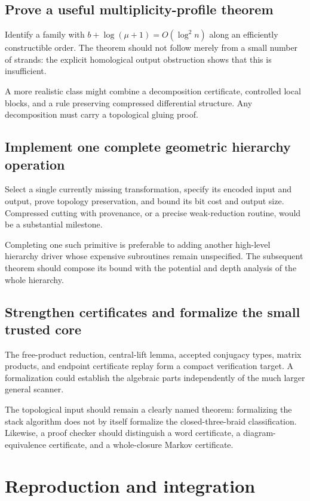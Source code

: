 \documentclass[11pt,letterpaper]{article}
\theoremstyle{definition}
\begin{document}
\subsection{Prove a useful multiplicity-profile theorem}

Identify a family with
\(b+\log(\mu+1)=O(\log^2 n)\) along an efficiently constructible order.
The theorem should not follow merely from a small number of strands:
the explicit homological output obstruction shows that this is
insufficient.

A more realistic class might combine a decomposition certificate,
controlled local blocks, and a rule preserving compressed differential
structure. Any decomposition must carry a topological gluing proof.

\subsection{Implement one complete geometric hierarchy operation}

Select a single currently missing transformation, specify its encoded
input and output, prove topology preservation, and bound its bit cost
and output size. Compressed cutting with provenance, or a precise
weak-reduction routine, would be a substantial milestone.

Completing one such primitive is preferable to adding another
high-level hierarchy driver whose expensive subroutines remain
unspecified. The subsequent theorem should compose its bound with
the potential and depth analysis of the whole hierarchy.

\subsection{Strengthen certificates and formalize the small trusted core}

The free-product reduction, central-lift lemma, accepted conjugacy
types, matrix products, and endpoint certificate replay form a compact
verification target. A formalization could establish the algebraic
parts independently of the much larger general scanner.

The topological input should remain a clearly named theorem:
formalizing the stack algorithm does not by itself formalize the
closed-three-braid classification. Likewise, a proof checker should
distinguish a word certificate, a diagram-equivalence certificate, and
a whole-closure Markov certificate.

\section{Reproduction and integration}
\label{sec:reproduce}
\end{document}

